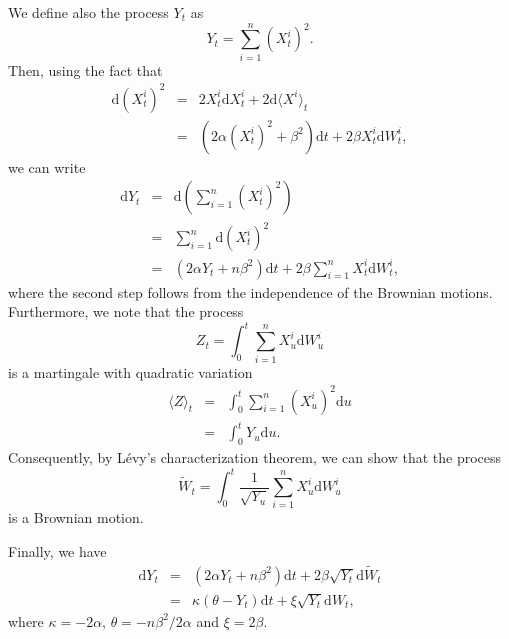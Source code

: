 We define also the process $Y_t$ as  
\begin{equation}
Y_t = \sum_{i = 1}^n \left( X_t^i \right)^2.
\end{equation}
Then, using the fact that
\begin{eqnarray}
\mathrm{d} \left( X_t^i \right)^2 & = & 2 X_t^i \mathrm{d}X_t^i + 2 \mathrm{d} \langle X^i \rangle_t \nonumber\\
& = & \left( 2 \alpha \left( X_t^i \right)^2 + \beta^2 \right) \mathrm{d}t + 2 \beta X_t^i \mathrm{d}W_t^i,
\end{eqnarray}
we can write
\begin{eqnarray}\label{eq:expressing CIR processes from OU processes}
\mathrm{d}Y_t & = & \mathrm{d} \left( \sum_{i = 1}^n \left( X_t^i \right)^2 \right) \nonumber\\
& = & \sum_{i = 1}^n \mathrm{d} \left( X_t^i \right)^2 \nonumber\\
& = & \left( 2 \alpha Y_t + n \beta^2 \right) \mathrm{d}t + 2 \beta \sum_{i = 1}^n X_t^i \mathrm{d}W_t^i,
\end{eqnarray}
where the second step follows from the independence of the Brownian motions. Furthermore, we  note that the process
\begin{equation}
Z_t = \int_0^t \sum_{i = 1}^n X_u^i \mathrm{d}W_u^i
\end{equation}
is a martingale with quadratic variation
\begin{eqnarray}
\langle Z \rangle_t & = & \int_0^t \sum_{i = 1}^n \left( X_u^i \right)^2 \mathrm{d}u \nonumber\\
& = & \int_0^t Y_u \mathrm{d}u.
\end{eqnarray}
Consequently, by L\'evy's characterization theorem, we can show that the process
\begin{equation}
\widetilde{W}_t = \int_0^t \frac{1}{\sqrt{Y_u}} \sum_{i = 1}^n X_u^i \mathrm{d}W_u^i
\end{equation}
is a Brownian motion.

Finally, we have 
\begin{eqnarray}\label{eq:equivalent CIR process}
\mathrm{d}Y_t & = & \left( 2 \alpha Y_t + n \beta^2 \right) \mathrm{d}t + 2 \beta \sqrt{Y_t} \mathrm{d}\tilde{W}_t \nonumber\\
& = & \kappa \left( \theta - Y_t \right) \mathrm{d}t + \xi \sqrt{Y_t} \mathrm{d}W_t,
\end{eqnarray}
where $\kappa = -2 \alpha$, $\theta = -n \beta^2 / 2 \alpha$ and $\xi = 2 \beta$.

